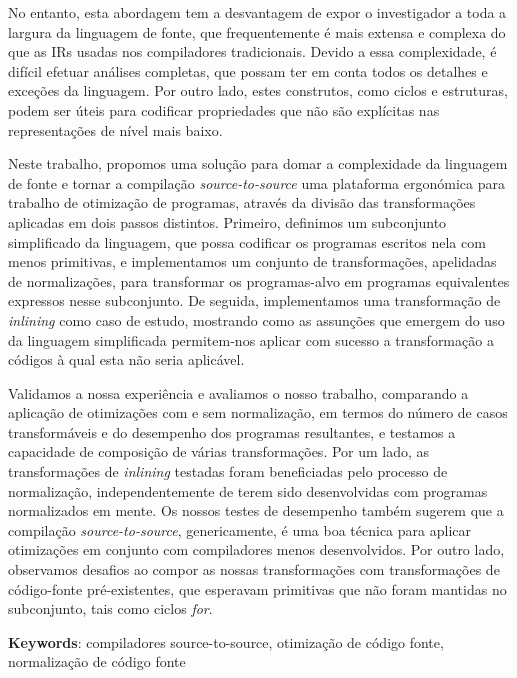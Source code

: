 No entanto, esta abordagem tem a desvantagem de expor o investigador a toda a largura da linguagem de fonte, que frequentemente é mais extensa e complexa do que as IRs usadas nos compiladores tradicionais. Devido a essa complexidade, é difícil efetuar análises completas, que possam ter em conta todos os detalhes e exceções da linguagem. Por outro lado, estes construtos, como ciclos e estruturas, podem ser úteis para codificar propriedades que não são explícitas nas representações de nível mais baixo.

Neste trabalho, propomos uma solução para domar a complexidade da linguagem de fonte e tornar a compilação \textit{source-to-source} uma plataforma ergonómica para trabalho de otimização de programas, através da divisão das transformações aplicadas em dois passos distintos. Primeiro, definimos um subconjunto simplificado da linguagem, que possa codificar os programas escritos nela com menos primitivas, e implementamos um conjunto de transformações, apelidadas de normalizações, para transformar os programas-alvo em programas equivalentes expressos nesse subconjunto. De seguida, implementamos uma transformação de \textit{inlining} como caso de estudo, mostrando como as assunções que emergem do uso da linguagem simplificada permitem-nos aplicar com sucesso a transformação a códigos à qual esta não seria aplicável.

Validamos a nossa experiência e avaliamos o nosso trabalho, comparando a aplicação de otimizações com e sem normalização, em termos do número de casos transformáveis e do desempenho dos programas resultantes, e testamos a capacidade de composição de várias transformações. Por um lado, as transformações de \textit{inlining} testadas foram beneficiadas pelo processo de normalização, independentemente de terem sido desenvolvidas com programas normalizados em mente. Os nossos testes de desempenho também sugerem que a compilação \textit{source-to-source}, genericamente, é uma boa técnica para aplicar otimizações em conjunto com compiladores menos desenvolvidos. Por outro lado, observamos desafios ao compor as nossas transformações com transformações de código-fonte pré-existentes, que esperavam primitivas que não foram mantidas no subconjunto, tais como ciclos \textit{for}.

\vspace*{10mm}\noindent
\textbf{Keywords}: compiladores source-to-source, otimização de código fonte, normalização de código fonte
